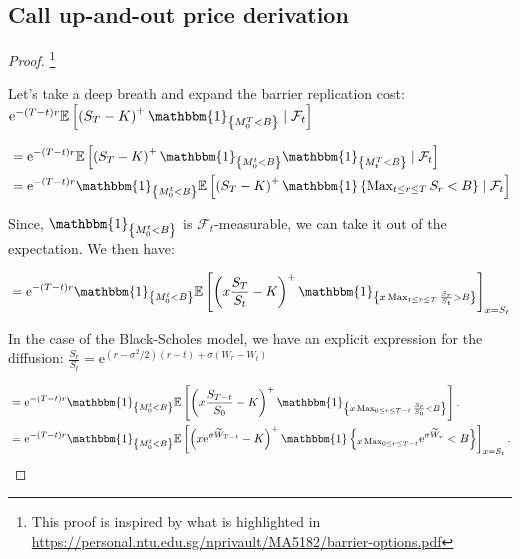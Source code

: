 \begin{appendices}

\section{Call up-and-out price derivation}
\label{appendix:a}

\begin{proof}\footnote{This proof is inspired by what is highlighted in \url{https://personal.ntu.edu.sg/nprivault/MA5182/barrier-options.pdf}}

Let's take a deep breath and expand the barrier replication cost:\\

$\mathrm{e}^{-(T-t) r} \mathbb{E}\left[\left(S_{T}-K\right)^{+} \mathbbm{1}_{\left\{M_{0}^{T}<B\right\}} \mid \mathcal{F}_{t}\right]$

$$
\begin{aligned}
& =\mathrm{e}^{-(T-t) r} \mathbb{E}\left[\left(S_{T}-K\right)^{+} \mathbbm{1}_{\left\{M_{0}^{t}<B\right\}} \mathbbm{1}_{\left\{M_{t}^{T}<B\right\}} \mid \mathcal{F}_{t}\right] \\
& =\mathrm{e}^{-(T-t) r} \mathbbm{1}_{\left\{M_{0}^{t}<B\right\}} \mathbb{E}\left[\left(S_{T}-K\right)^{+} \mathbbm{1}\left\{\operatorname{Max}_{t \leq r \leq T} S_{r}<B\right\} \mid \mathcal{F}_{t}\right] \\
\end{aligned}
$$

Since, $\mathbbm{1}_{\left\{M_{0}^{t}<B\right\}}$ is $\mathcal{F}_{t}$-measurable, we can take it out of the expectation. We then have:

$$
\begin{aligned}
& =\mathrm{e}^{-(T-t) r} \mathbbm{1}_{\left\{M_{0}^{t}<B\right\}} \mathbb{E}\left[\left(x \frac{S_{T}}{S_{t}}-K\right)^{+} \mathbbm{1}_{\left\{x \operatorname{Max}_{t \leq r \leq T} \frac{S_{r}}{S_{t}}>B\right\}}\right]_{x=S_{t}} \\
\end{aligned}
$$

In the case of the Black-Scholes model, we have an explicit expression for the diffusion:
$ \frac{S_{r}}{S_{t}} =\mathrm{e}^{(r-\sigma^{2} / 2)(r-t)+\sigma\left(W_{r}-W_{t}\right)} $

$$
\begin{aligned}
& =\mathrm{e}^{-(T-t) r} \mathbbm{1}_{\left\{M_{0}^{t}<B\right\}} \mathbb{E}\left[\left(x \frac{S_{T-t}}{S_0}-K\right)^{+} \mathbbm{1}_{\left\{x \operatorname{Max}_{0 \leq r \leq T-t} \frac{S_{r}}{S_0}<B\right\}}\right] . \\
& =\mathrm{e}^{-(T-t) r} \mathbbm{1}_{\left\{M_{0}^{t}<B\right\}} \mathbb{E}\left[\left(x \mathrm{e}^{\sigma \widetilde{W}_{T-t}}-K\right)^{+} \mathbbm{1}\left\{_{x \operatorname{Max}_{0 \leq r \leq T-t}} \mathrm{e}^{\sigma \widetilde{W}_{r}}<B\right\}\right]_{x=S_{t}} . \\
\end{aligned}
$$


\end{proof}
\end{appendices}
